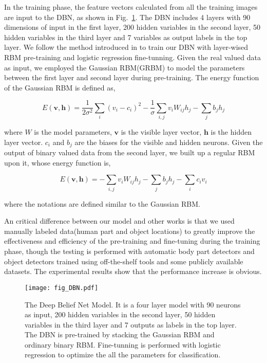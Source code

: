 \documentclass{article}
\begin{document}
In the training phase, the feature vectors calculated from all the training images are input to the DBN, as shown in Fig.~\ref{fig:DBN}.  The DBN includes 4 layers with 90 dimensions of input in the first layer, 200 hidden variables in the second layer, 50 hidden variables in the third layer and 7 variables as output labels in the top layer.  We follow the method introduced in \cite{Hinton06} to train our DBN with layer-wised RBM pre-training and logistic regression fine-tunning.  Given the real valued data as input, we employed the Gaussian RBM(GRBM) to model the parameters between the first layer and second layer during pre-training.  The energy function of the Gaussian RBM is defined as,

\begin{equation}\label{eq:GRBM}
E(\textbf{v}, \textbf{h}) = \frac{1}{2 {\sigma}^{2}} \sum_i (v_i-c_i)^{2} - \frac{1}{\sigma}  \sum_{i,j} v_i W_{ij} h_j - \sum_{j} b_j h_j
\end{equation}

\noindent where $W$ is the model parameters, $\textbf{v}$ is the visible layer vector, $\textbf{h}$ is the hidden layer vector.  $c_i$ and $b_j$ are the biases for the visible and hidden neurons.  Given the output of binary valued data from the second layer, we built up a regular RBM upon it, whose energy function is,

\begin{equation}
E(\textbf{v}, \textbf{h}) = -\sum_{i,j} v_i W_{ij} h_j - \sum_{j} b_j h_j - \sum_{i} c_i v_i
\end{equation}

\noindent where the notations are defined similar to the Gaussian RBM.

An critical difference between our model and other works is that we used manually labeled data(human part and object locations) to greatly improve the effectiveness and efficiency of the pre-training and fine-tuning during the training phase, though the testing is performed with automatic body part detectors and object detectors trained using off-the-shelf tools and some publicly available datasets.  The experimental results show that the performance increase is obvious.

\begin{figure}[phtb]
\centering
\texttt{[image: fig\_DBN.pdf]}
\vspace{-8mm}
\caption{The Deep Belief Net Model. It is a four layer model with 90 neurons as input, 200 hidden variables in the second layer, 50 hidden variables in the third layer and 7 outputs as labels in the top layer. The DBN is pre-trained by stacking the Gaussian RBM and ordinary binary RBM. Fine-tunning is performed with logistic regression to optimize the all the parameters for classification.}
\label{fig:DBN}
\end{figure}
\end{document}
